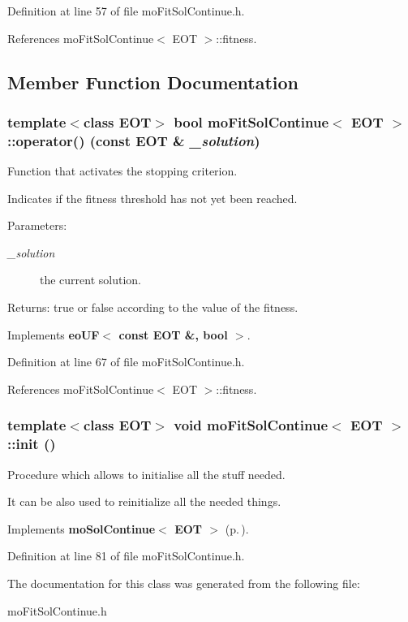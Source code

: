Definition at line 57 of file mo\-Fit\-Sol\-Continue.h.

References mo\-Fit\-Sol\-Continue$<$ EOT $>$::fitness.

\subsection{Member Function Documentation}
\subsubsection{\setlength{\rightskip}{0pt plus 5cm}template$<$class EOT$>$ bool {\bf mo\-Fit\-Sol\-Continue}$<$ EOT $>$::operator() (const EOT \& {\em \_\-solution})\hspace{0.3cm}{\tt  [inline, virtual]}}\label{classmo_fit_sol_continue_a1}


Function that activates the stopping criterion. 

Indicates if the fitness threshold has not yet been reached.

\begin{Desc}
\item[Parameters:]
\begin{description}
\item[{\em \_\-solution}]the current solution. \end{description}
\end{Desc}
\begin{Desc}
\item[Returns:]true or false according to the value of the fitness. \end{Desc}


Implements {\bf eo\-UF$<$ const EOT \&, bool $>$}.

Definition at line 67 of file mo\-Fit\-Sol\-Continue.h.

References mo\-Fit\-Sol\-Continue$<$ EOT $>$::fitness.
\subsubsection{\setlength{\rightskip}{0pt plus 5cm}template$<$class EOT$>$ void {\bf mo\-Fit\-Sol\-Continue}$<$ EOT $>$::init ()\hspace{0.3cm}{\tt  [inline, virtual]}}\label{classmo_fit_sol_continue_a2}


Procedure which allows to initialise all the stuff needed. 

It can be also used to reinitialize all the needed things. 

Implements {\bf mo\-Sol\-Continue$<$ EOT $>$} {\rm (p.\,\pageref{classmo_sol_continue_a0})}.

Definition at line 81 of file mo\-Fit\-Sol\-Continue.h.

The documentation for this class was generated from the following file:\begin{CompactItemize}
\item 
mo\-Fit\-Sol\-Continue.h\end{CompactItemize}

